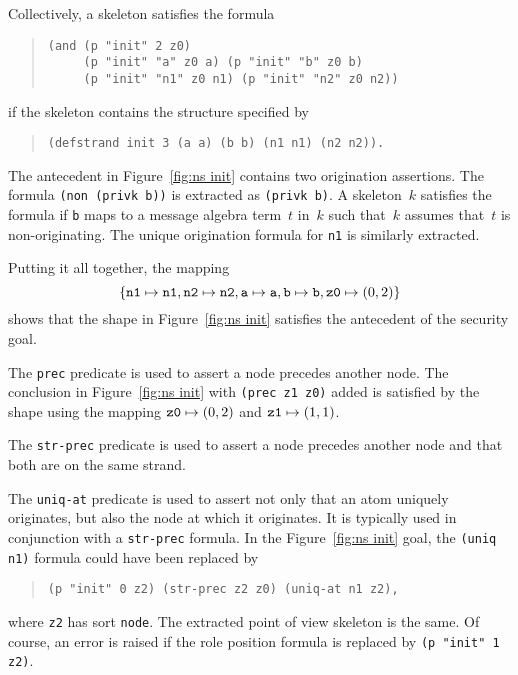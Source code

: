 \documentclass[12pt]{article}
\begin{document}
Collectively, a skeleton satisfies the formula
\begin{quote}
\begin{verbatim}
(and (p "init" 2 z0)
     (p "init" "a" z0 a) (p "init" "b" z0 b)
     (p "init" "n1" z0 n1) (p "init" "n2" z0 n2))
\end{verbatim}
\end{quote}
if the skeleton contains the structure specified by
\begin{quote}
\begin{verbatim}
(defstrand init 3 (a a) (b b) (n1 n1) (n2 n2)).
\end{verbatim}
\end{quote}

The antecedent in Figure~\ref{fig:ns init} contains two origination
assertions.  The formula \texttt{(non (privk b))} is extracted as
\texttt{(privk b)}.  A skeleton~$k$ satisfies the formula if
\texttt{b} maps to a message algebra term~$t$ in~$k$ such that~$k$
assumes that~$t$ is non-originating.  The unique origination formula for
\texttt{n1} is similarly extracted.

Putting it all together, the mapping
\[\{\mathtt{n1}\mapsto\mathtt{n1},
\mathtt{n2}\mapsto\mathtt{n2}, \mathtt{a}\mapsto\mathtt{a},
\mathtt{b}\mapsto\mathtt{b},\mbox{\tt z0}\mapsto(0,2)\}\] shows that
the shape in Figure~\ref{fig:ns init} satisfies the antecedent of the
security goal.

The \texttt{prec} predicate is used to assert a node precedes another
node.  The conclusion in Figure~\ref{fig:ns init} with \texttt{(prec
  z1 z0)} added is satisfied by the shape using the mapping $\mbox{\tt
  z0}\mapsto(0,2)$ and $\mbox{\tt z1}\mapsto(1,1)$.

The \texttt{str-prec} predicate is used to assert a node precedes another
node and that both are on the same strand.

The \texttt{uniq-at} predicate is used to assert not only that an atom
uniquely originates, but also the node at which it originates.  It is
typically used in conjunction with a \texttt{str-prec} formula.  In
the Figure~\ref{fig:ns init} goal, the \texttt{(uniq n1)} formula
could have been replaced by
\begin{quote}
\begin{verbatim}
(p "init" 0 z2) (str-prec z2 z0) (uniq-at n1 z2),
\end{verbatim}
\end{quote}
where \texttt{z2} has sort \texttt{node}.  The extracted point of view
skeleton is the same.  Of course, an error is raised if the role
position formula is replaced by \texttt{(p "init" 1 z2)}.
\end{document}
